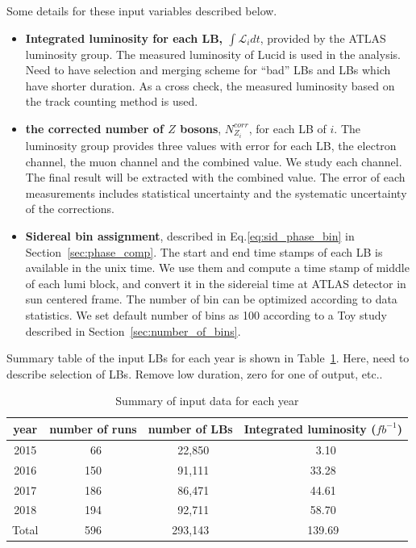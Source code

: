 Some details for these input variables described below.

\begin{itemize}
 \item \textbf{Integrated luminosity for each LB, $\int\mathcal{L}_idt$}, provided by the ATLAS luminosity group.
   The measured luminosity of Lucid is used in the analysis. 
   Need to have selection and merging scheme for ``bad'' LBs and LBs which have shorter duration. 
   As a cross check, the measured luminosity based on the track counting method is used.
 \item \textbf{the corrected number of $Z$ bosons}, $N_{Z_i}^{corr}$, for each LB of $i$.
   The luminosity group provides three values with error for each LB, the electron channel, the muon channel and the combined value.
   We study each channel. The final result will be extracted with the combined value.
   The error of each measurements includes statistical uncertainty and the systematic uncertainty of the corrections. 
  \item \textbf{Sidereal bin assignment}, described in Eq.\ref{eq:sid_phase_bin} in Section~\ref{sec:phase_comp}. 
   The start and end time stamps of each LB is available in the unix time. 
   We use them and compute a time stamp of middle of each lumi block, and convert it in the sidereial time at ATLAS detector in sun centered frame.
   The number of bin can be optimized according to data statistics. We set default number of bins as 100 according to a Toy study described in Section~\ref{sec:number_of_bins}.
\end{itemize}



Summary table of the input LBs for each year is shown in Table~\ref{tab:data_LBs}.
Here, need to describe selection of LBs. Remove low duration, zero for one of output, etc.. 

\begin{table}
\centering 
\begin{tabular}{c | c c c} %
year & number of runs & number of LBs & Integrated luminosity ($fb^{-1}$)\\
\hline
2015  & ~66  & ~22,850  & ~3.10  \\
2016  & 150  & ~91,111  & 33.28  \\
2017  & 186  & ~86,471  & 44.61  \\
2018  & 194  & ~92,711  & 58.70  \\
\hline 
Total & 596  & 293,143  & 139.69 \\
\end{tabular}
\caption{\label{tab:data_LBs} Summary of input data for each year}
\end{table}

